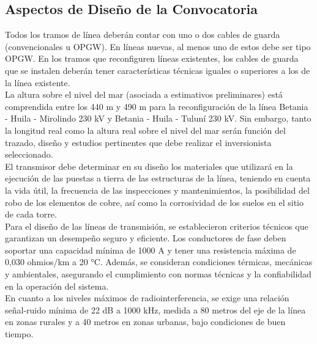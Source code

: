 \subsection*{Aspectos de Diseño de la Convocatoria}
Todos los tramos de línea deberán contar con uno o dos cables de guarda (convencionales u OPGW). En líneas nuevas, al menos uno de estos debe ser tipo OPGW. En los tramos que reconfiguren líneas existentes, los cables de guarda que se instalen deberán tener características técnicas iguales o superiores a los de la línea existente.\\La altura sobre el nivel del mar (asociada a estimativos preliminares) está comprendida entre los 440 m y 490 m para la reconfiguración de la línea Betania - Huila - Mirolindo 230 kV y Betania - Huila - Tuluní 230 kV. Sin embargo, tanto la longitud real como la altura real sobre el nivel del mar serán función del trazado, diseño y estudios pertinentes que debe realizar el inversionista seleccionado.\\El transmisor debe determinar en su diseño los materiales que utilizará en la ejecución de las puestas a tierra de las estructuras de la línea, teniendo en cuenta la vida útil, la frecuencia de las inspecciones y mantenimientos, la posibilidad del robo de los elementos de cobre, así como la corrosividad de los suelos en el sitio de cada torre.\\Para el diseño de las líneas de transmisión, se establecieron criterios técnicos que garantizan un desempeño seguro y eficiente. Los conductores de fase deben soportar una capacidad mínima de 1000 A y tener una resistencia máxima de 0,030 ohmios/km a 20 °C. Además, se consideran condiciones térmicas, mecánicas y ambientales, asegurando el cumplimiento con normas técnicas y la confiabilidad en la operación del sistema.\\En cuanto a los niveles máximos de radiointerferencia, se exige una relación señal-ruido mínima de 22 dB a 1000 kHz, medida a 80 metros del eje de la línea en zonas rurales y a 40 metros en zonas urbanas, bajo condiciones de buen tiempo.

